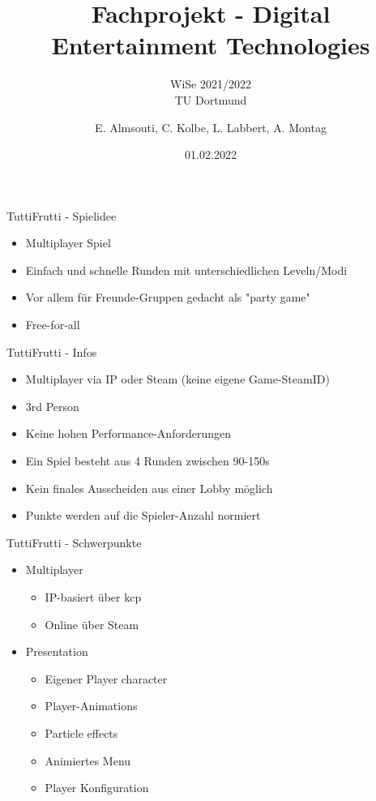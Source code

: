 \documentclass[xcolor=dvipsnames]{beamer}
\title{Fachprojekt - Digital Entertainment Technologies}
\subtitle{WiSe 2021/2022 \\ TU Dortmund}
\author{E. Almsouti, C. Kolbe,  L. Labbert, A. Montag}
\institute{}
\date{01.02.2022}
\begin{document}
\begin{frame}
\titlepage
\end{frame}

\begin{frame}{TuttiFrutti - Spielidee}
\begin{itemize}
\item Multiplayer Spiel
\item Einfach und schnelle Runden mit unterschiedlichen Leveln/Modi \item Vor allem für Freunde-Gruppen gedacht als "party game"
\item Free-for-all 
\end{itemize}

\end{frame}

\begin{frame}{TuttiFrutti - Infos}
\begin{itemize}
\item  Multiplayer via IP oder Steam (keine eigene Game-SteamID) 
\item 3rd Person
\item Keine hohen Performance-Anforderungen 
\item Ein Spiel besteht aus 4 Runden zwischen 90-150s 
\item Kein finales Ausscheiden aus einer Lobby möglich
\item Punkte werden auf die Spieler-Anzahl normiert

\end{itemize}

\end{frame}

\begin{frame}{TuttiFrutti - Schwerpunkte}
\begin{itemize}
	\item Multiplayer
	\begin{itemize}
		\item IP-basiert über kcp 
		\item Online über Steam
	\end{itemize}
	\item Presentation
	\begin{itemize}
		\item Eigener Player character 
		\item Player-Animations
		\item Particle effects
		\item Animiertes Menu 
		\item Player Konfiguration
	\end{itemize}
\end{itemize}

\end{frame}
\end{document}
